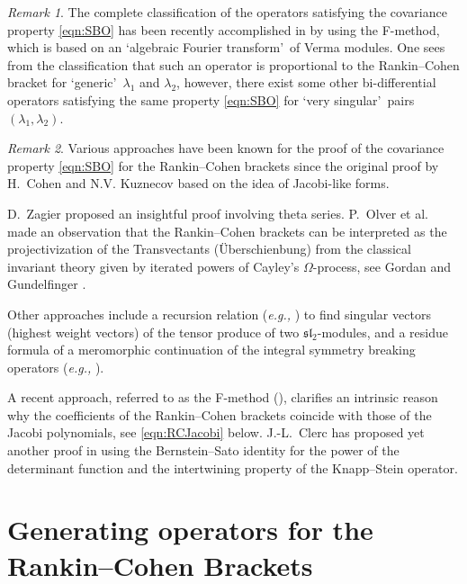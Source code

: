 \documentclass[12pt]{amsart}
\theoremstyle{plain} %
\theoremstyle{definition} %
\theoremstyle{remark} %
\newtheorem{remark}{Remark} %
\begin{document}
\begin{remark}
The complete classification of the operators satisfying
 the covariance property \eqref{eqn:SBO}
 has been recently accomplished in \cite[Thm.\ 9.1]{KP2}
 by using the F-method, 
 which is based on an \lq{algebraic Fourier transform}\rq\
 of Verma modules.  
One sees from the classification that such an operator is proportional to the Rankin--Cohen bracket
 for \lq{generic}\rq\ $\lambda_1$ and $\lambda_2$, 
however, 
 there exist some other bi-differential operators
 satisfying the same property \eqref{eqn:SBO}
 for \lq{very singular}\rq\ pairs $(\lambda_1, \lambda_2)$.  
\end{remark}

\begin{remark}
Various approaches have been known 
 for the proof of the covariance property \eqref{eqn:SBO}
 for the Rankin--Cohen brackets
 since the original proof 
 by H.\ Cohen \cite{xCo75} and N.V. Kuznecov \cite{Ku75} based on the idea of Jacobi-like forms.  

D.\ Zagier \cite{Z94} proposed an  insightful proof involving theta series.
 P.\ Olver et al. \cite{Olver,OlverSan} made an observation that the Rankin--Cohen brackets can be interpreted
 as the projectivization
 of the Transvectants (\"Uberschienbung) from the classical invariant theory
 given by iterated powers
 of Cayley's $\Omega$-process, 
 see  Gordan and Gundelfinger \cite{Gordan, Gundel}.  



Other approaches include a recursion relation ({\it{e.g.,}} \cite{P12})
 to find singular vectors (highest weight vectors)
 of the tensor produce of two $\mathfrak{sl}_2$-modules, 
 and a residue formula
 of a meromorphic continuation 
 of the integral symmetry breaking operators
 ({\it{e.g.,}} \cite{K18}).  



A recent approach, 
 referred to as the F-method (\cite[Sect.\ 7]{KP2}), clarifies an intrinsic reason
 why the coefficients of the Rankin--Cohen brackets coincide with those of the Jacobi polynomials, 
 see \eqref{eqn:RCJacobi} below.  
J.-L.\ Clerc has proposed yet another proof 
in \cite{C17} 
using the Bernstein--Sato identity
 for the power of the determinant function
 and the intertwining property
 of the Knapp--Stein operator.  
\end{remark}



\section{Generating operators for the Rankin--Cohen Brackets}
\label{sec:genRC}
\end{document}
